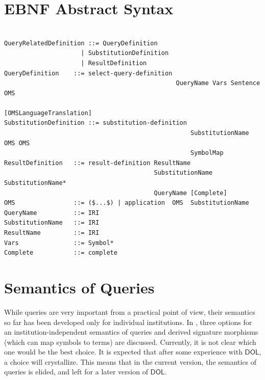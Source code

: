 \documentclass[10pt,fleqn,final]{scrreprt}
\newcommand*{\syntax}[1]{\texttt{#1}}
\newcommand{\semdom}[1]{
\begin{center}
\fbox{$#1$}
\end{center}
}
\newcommand*{\DOL}{\ensuremath{\mathsf{DOL}}\xspace}
\newcommand{\sclause}[1]{\section{#1}}
\begin{document}
\sclause{EBNF Abstract Syntax}


\begin{lstlisting}[language=ebnf,escapeinside={()},mathescape]  % abstract syntax

QueryRelatedDefinition ::= QueryDefinition
                     | SubstitutionDefinition
                     | ResultDefinition
QueryDefinition    ::= select-query-definition
                                               QueryName Vars Sentence OMS
                                               [OMSLanguageTranslation]
SubstitutionDefinition ::= substitution-definition
                                                   SubstitutionName OMS OMS
                                                   SymbolMap
ResultDefinition   ::= result-definition ResultName
                                         SubstitutionName SubstitutionName*
                                         QueryName [Complete]
OMS                ::= ($...$) | application  OMS  SubstitutionName 
QueryName          ::= IRI
SubstitutionName   ::= IRI
ResultName         ::= IRI
Vars               ::= Symbol*
Complete           ::= complete
\end{lstlisting}


\sclause{Semantics of Queries}\label{s:sem-queries}

While queries are very important from a practical point of view, their
semantics so far has been developed only for individual institutions.
In \cite{MossakowskiEtAl15a}, three options for an
institution-independent semantics of queries and derived signature
morphisms (which can map symbols to terms) are discussed. Currently,
it is not clear which one would be the best choice. It is expected
that after some experience with \DOL, a choice will crystallize. This
means that in the current version, the semantics of queries is
elided, and left for a later version of \DOL.

%
%
%
%

\end{document}
